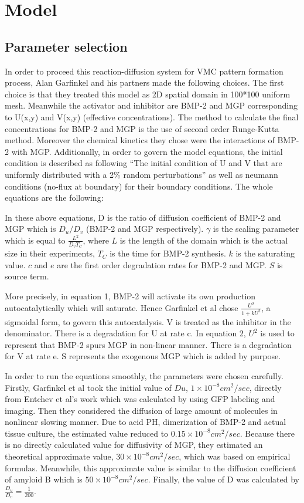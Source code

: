\documentclass{article}
\begin{document}
	\section{Model}

\subsection{Parameter selection}

In order to proceed this reaction-diffusion system for VMC pattern formation process, Alan Garfinkel and his partners made the following choices. The first choice is that they treated this model as 2D spatial domain in 100*100 uniform mesh. Meanwhile the activator and inhibitor are BMP-2 and MGP corresponding to U(x,y) and V(x,y) (effective concentrations). The method to calculate the final concentrations for BMP-2 and MGP is the use of second order Runge-Kutta method. Moreover the chemical kinetics they chose were the interactions of BMP-2 with MGP. Additionally, in order to govern the model equations, the initial condition is described as following “The initial condition of U and V that are uniformly distributed with a 2\% random perturbations” as well as neumann conditions (no-flux at boundary) for their boundary conditions. The whole equations are the following:

In these above equations, D is the ratio of diffusion coefficient of BMP-2 and MGP which is $D_u / D_v$ (BMP-2 and MGP respectively). $\gamma$ is the scaling parameter which is equal to $\frac{L^2}{D_v T_C}$, where $L$ is the length of the domain which is the actual size in their experiments, $T_C$ is the time for BMP-2 synthesis. $k$ is the saturating value. $c$ and $e$ are the first order degradation rates for BMP-2 and MGP. $S$ is source term.

More precisely, in equation 1, BMP-2 will activate its own production autocatalytically which will saturate. Hence Garfinkel et al chose $\frac{U^2}{1+k U^2}$, a sigmoidal form, to govern this autocatalysis. V is treated as the inhibitor in the denominator. There is a degradation for U at rate c. In equation 2, $U^2$ is used to represent that BMP-2 spurs MGP in non-linear manner. There is a degradation for V at rate e. S represents the exogenous MGP which is added by purpose.

In order to run the equations smoothly, the parameters were chosen carefully. Firstly, Garfinkel et al took the initial value of $Du$, $1 \times 10^{-8} cm^2/sec$, directly from Entchev et al’s work which was calculated by using GFP labeling and imaging. Then they considered the diffusion of large amount of molecules in nonlinear slowing manner. Due to acid PH, dimerization of BMP-2 and actual tissue culture, the estimated value reduced to $0.15 \times 10^{-8} cm^2/sec$. Because there is no directly calculated value for diffusivity of MGP, they estimated an theoretical approximate value, $30 \times 10^{-8} cm^2/sec$, which was based on empirical formulas. Meanwhile, this approximate value is similar to the diffusion coefficient of amyloid B which is $50 \times 10^{-8} cm^2/sec$. Finally, the value of D was calculated by $\frac{D_u}{D_v} = \frac{1}{200}$.
\end{document}
